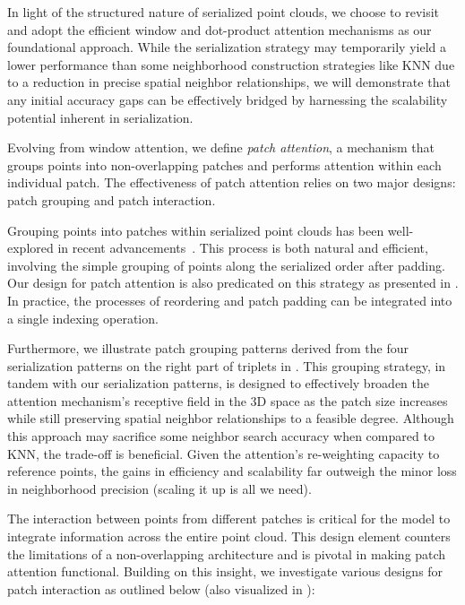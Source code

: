In light of the structured nature of serialized point clouds, we choose to revisit and adopt the efficient window and dot-product attention mechanisms as our foundational approach. 
While the serialization strategy may temporarily yield a lower performance than some neighborhood construction strategies like KNN due to a reduction in precise spatial neighbor relationships,
we will demonstrate that any initial accuracy gaps can be effectively bridged by harnessing the scalability potential inherent in serialization.

Evolving from window attention, we define \textit{patch attention}, a mechanism that groups points into non-overlapping patches and performs attention within each individual patch. The effectiveness of patch attention relies on two major designs: patch grouping and patch interaction.

 Grouping points into patches within serialized point clouds has been well-explored in recent advancements~\cite{Wang2023OctFormer, liu2023flatformer}. This process is both natural and efficient, involving the simple grouping of points along the serialized order after padding. Our design for patch attention is also predicated on this strategy as presented in . In practice, the processes of reordering and patch padding can be integrated into a single indexing operation.

Furthermore, we illustrate patch grouping patterns derived from the four serialization patterns on the right part of triplets in . This grouping strategy, in tandem with our serialization patterns, is designed to effectively broaden the attention mechanism's receptive field in the 3D space as the patch size increases while still preserving spatial neighbor relationships to a feasible degree. Although this approach may sacrifice some neighbor search accuracy when compared to KNN, the trade-off is beneficial. Given the attention's re-weighting capacity to reference points, the gains in efficiency and scalability far outweigh the minor loss in neighborhood precision (scaling it up is all we need).

 The interaction between points from different patches is critical for the model to integrate information across the entire 
point cloud. This design element counters the limitations of a non-overlapping architecture and is pivotal in making patch attention functional. Building on this insight, we investigate various designs for patch interaction as outlined below (also visualized in ):

